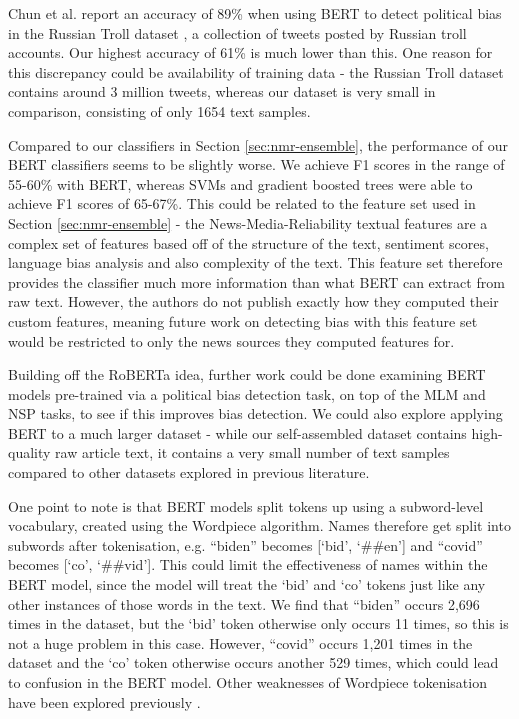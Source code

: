 Chun et al. report an accuracy of 89\% when using BERT to detect political bias in the Russian Troll dataset \cite{russian-troll}, a collection of tweets posted by Russian troll accounts. Our highest accuracy of 61\% is much lower than this. One reason for this discrepancy could be availability of training data - the Russian Troll dataset contains around 3 million tweets, whereas our dataset is very small in comparison, consisting of only 1654 text samples.

Compared to our classifiers in Section \ref{sec:nmr-ensemble}, the performance of our BERT classifiers seems to be slightly worse. We achieve F1 scores in the range of 55-60\% with BERT, whereas SVMs and gradient boosted trees were able to achieve F1 scores of 65-67\%. This could be related to the feature set used in Section \ref{sec:nmr-ensemble} - the News-Media-Reliability textual features
are a complex set of features based off of the structure of the text, sentiment scores, language bias analysis and also complexity of the text. This feature set therefore provides the classifier much more information than what BERT can extract from raw text. However, the authors do not publish exactly how they computed their custom features, meaning future work on detecting bias with this feature set would be restricted to only the news sources they computed features for.

Building off the RoBERTa idea, further work could be done examining BERT models pre-trained via a political bias detection task, on top of the MLM and NSP tasks, to see if this improves bias detection. We could also explore applying BERT to a much larger dataset - while our self-assembled dataset contains high-quality raw article text, it contains a very small number of text samples compared to other datasets explored in previous literature.

One point to note is that BERT models split tokens up using a subword-level vocabulary, created using the Wordpiece \cite{wordpiece} algorithm. Names therefore get split into subwords after tokenisation, e.g. ``biden'' becomes [`bid', `\#\#en'] and ``covid'' becomes [`co', `\#\#vid']. This could limit the effectiveness of names within the BERT model, since the model will treat the `bid' and `co' tokens just like any other instances of those words in the text. We find that ``biden'' occurs 2,696 times in the dataset, but the `bid' token otherwise only occurs 11 times, so this is not a huge problem in this case. However, ``covid'' occurs 1,201 times in the dataset and the `co' token otherwise occurs another 529 times, which could lead to confusion in the BERT model. Other weaknesses of Wordpiece tokenisation have been explored previously \cite{wordpiece-weaknesses}.


